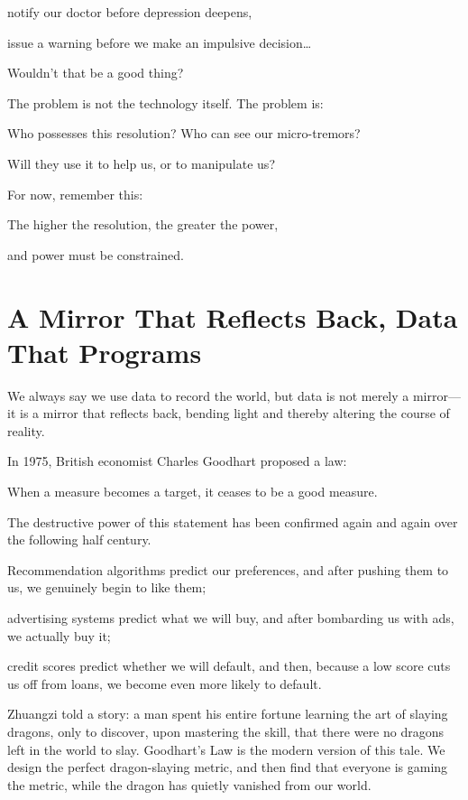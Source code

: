 notify our doctor before depression deepens,

issue a warning before we make an impulsive decision\ldots

Wouldn't that be a good thing?

\vspace{1em}

The problem is not the technology itself. The problem is:

Who possesses this resolution? Who can see our micro-tremors?

Will they use it to help us, or to manipulate us?

For now, remember this:
\begin{importantbox}
The higher the resolution, the greater the power,

and power must be constrained.
\end{importantbox}

\newpage
\section{A Mirror That Reflects Back, Data That Programs}

We always say we use data to record the world, but data is not merely a mirror---it is a mirror that reflects back, bending light and thereby altering the course of reality.

In 1975, British economist Charles Goodhart proposed a law:

\begin{myquote}
When a measure becomes a target, it ceases to be a good measure.
\end{myquote}

The destructive power of this statement has been confirmed again and again over the following half century.


{\kaiti
Recommendation algorithms predict our preferences, and after pushing them to us, we genuinely begin to like them;

advertising systems predict what we will buy, and after bombarding us with ads, we actually buy it;

credit scores predict whether we will default, and then, because a low score cuts us off from loans, we become even more likely to default.
}

\vspace{1em}

Zhuangzi told a story: a man spent his entire fortune learning the art of slaying dragons, only to discover, upon mastering the skill, that there were no dragons left in the world to slay. Goodhart's Law is the modern version of this tale. We design the perfect dragon-slaying metric, and then find that everyone is gaming the metric, while the dragon has quietly vanished from our world.

